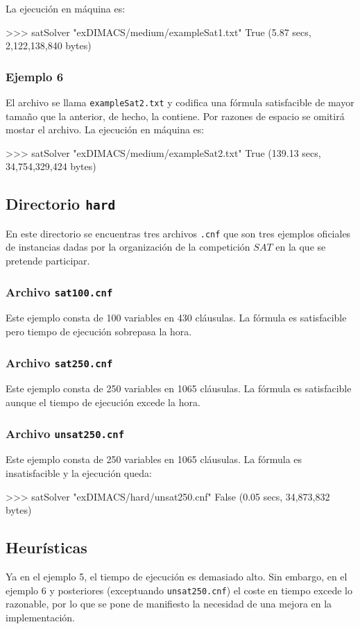 La ejecución en máquina es:
\begin{code}
>>> satSolver "exDIMACS/medium/exampleSat1.txt"
True
(5.87 secs, 2,122,138,840 bytes)
\end{code}

\subsubsection{Ejemplo 6}
El archivo se llama \texttt{exampleSat2.txt} y codifica una fórmula satisfacible de mayor tamaño que la anterior, de hecho, la contiene. Por razones de espacio se omitirá mostar el archivo. La ejecución en máquina es:
\begin{code}
>>> satSolver "exDIMACS/medium/exampleSat2.txt"
True
(139.13 secs, 34,754,329,424 bytes)
\end{code}

\subsection{Directorio \texttt{hard}}

En este directorio se encuentras tres archivos \texttt{.cnf} que son tres ejemplos oficiales de instancias dadas por la organización de la competición $SAT$ en la que se pretende participar.

\subsubsection{Archivo \texttt{sat100.cnf}}
Este ejemplo consta de 100 variables en 430 cláusulas. La fórmula es satisfacible pero tiempo de ejecución sobrepasa la hora.
\subsubsection{Archivo \texttt{sat250.cnf}}
Este ejemplo consta de 250 variables en 1065 cláusulas. La fórmula es satisfacible aunque el tiempo de ejecución excede la hora.
\subsubsection{Archivo \texttt{unsat250.cnf}}
Este ejemplo consta de 250 variables en 1065 cláusulas. La fórmula es insatisfacible y la ejecución queda:
\begin{code}
>>> satSolver "exDIMACS/hard/unsat250.cnf"
False
(0.05 secs, 34,873,832 bytes)
\end{code}

\subsection{Heurísticas}
Ya en el ejemplo 5, el tiempo de ejecución es demasiado alto. Sin embargo, en el ejemplo 6 y posteriores (exceptuando \texttt{unsat250.cnf}) el coste en tiempo excede lo razonable, por lo que se pone de manifiesto la necesidad de una mejora en la implementación.\\

